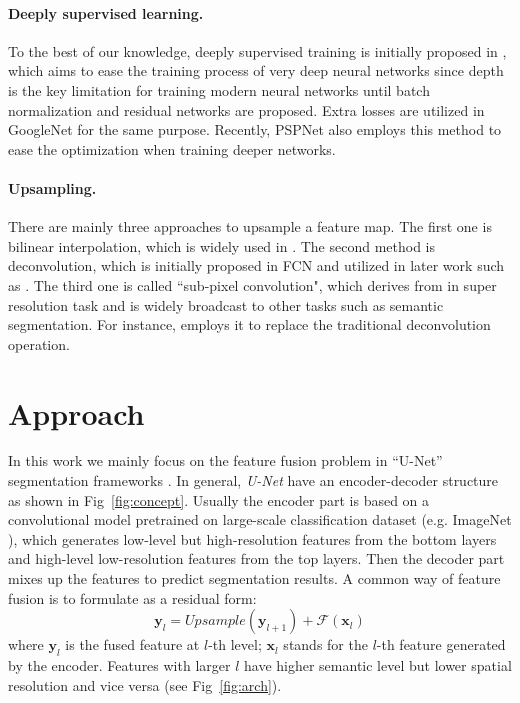 \documentclass[runningheads]{llncs}
\begin{document}
\paragraph{Deeply supervised learning.}
To the best of our knowledge, deeply supervised training is initially proposed in \cite{Lee2014Deeply}, which aims to ease the training process of very deep neural networks since depth is the key limitation for training modern neural networks until batch normalization \cite{Ioffe2015Batch} and residual networks \cite{He2016Deep} are proposed. Extra losses are utilized in GoogleNet \cite{Szegedy2015Going} for the same purpose. Recently, PSPNet \cite{Zhao2016Pyramid} also employs this method to ease the optimization when training deeper networks.


\paragraph{Upsampling.}
There are mainly three approaches to upsample a feature map. The first one is bilinear interpolation, which is widely used in \cite{Chen2016DeepLab,Chen2017Rethinking,Zhao2016Pyramid,Chen2014Semantic}. The second method is deconvolution, which is initially proposed in FCN \cite{Long2015Fully} and utilized in later work such as \cite{Badrinarayanan2017SegNet,Islam_2017_CVPR,Ronneberger2015U,Peng2017Large,Lin2016RefineNet}. The third one is called ``sub-pixel convolution", which derives from \cite{Shi2016Real,Aitken2017Checkerboard} in super resolution task and is widely broadcast to other tasks such as semantic segmentation. For instance, \cite{Wang2017Understanding} employs it to replace the traditional deconvolution operation. 


\section{Approach}
\label{sec:approach}

In this work we mainly focus on the feature fusion problem in ``U-Net'' segmentation frameworks \cite{Ghiasi2016Laplacian,Islam_2017_CVPR,Ronneberger2015U,Peng2017Large,Long2015Fully,Lin2016RefineNet}. In general, \emph{U-Net} have an encoder-decoder structure as shown in Fig~\ref{fig:concept}. Usually the encoder part is based on a convolutional model pretrained on large-scale classification dataset (e.g. ImageNet \cite{Deng2009ImageNet}), which generates low-level but high-resolution features from the bottom layers and high-level low-resolution features from the top layers. Then the decoder part mixes up the features to predict segmentation results. A common way of feature fusion \cite{Pohlen2016Full,Ghiasi2016Laplacian,Hariharan2014Hypercolumns,Islam_2017_CVPR,Ronneberger2015U,Peng2017Large,Lin2016RefineNet} is to formulate as a residual form:
\begin{equation}
\mathbf{y}_l=Upsample(\mathbf{y}_{l+1})+\mathcal{F}(\mathbf{x}_l)
\label{equ:basicfuse}
\end{equation}
where $\mathbf{y}_l$ is the fused feature at $l$-th level; $\mathbf{x}_l$ stands for the $l$-th feature generated by the encoder. Features with larger $l$ have higher semantic level but lower spatial resolution and vice versa (see Fig~\ref{fig:arch}). 
\end{document}
